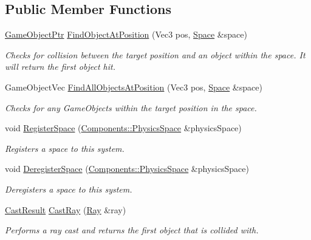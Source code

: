 \subsection*{Public Member Functions}
\begin{DoxyCompactItemize}
\item 
\hyperlink{classDCEngine_1_1GameObject}{Game\-Object\-Ptr} \hyperlink{classDCEngine_1_1Systems_1_1Physics_a786d02f2a6521108c37ac5918865f552}{Find\-Object\-At\-Position} (Vec3 pos, \hyperlink{classDCEngine_1_1Space}{Space} \&space)
\begin{DoxyCompactList}\small\item\em Checks for collision between the target position and an object within the space. It will return the first object hit. \end{DoxyCompactList}\item 
Game\-Object\-Vec \hyperlink{classDCEngine_1_1Systems_1_1Physics_accee13b6fdc523a6bcf346b3ce50e0bb}{Find\-All\-Objects\-At\-Position} (Vec3 pos, \hyperlink{classDCEngine_1_1Space}{Space} \&space)
\begin{DoxyCompactList}\small\item\em Checks for any Game\-Objects within the target position in the space. \end{DoxyCompactList}\item 
void \hyperlink{classDCEngine_1_1Systems_1_1Physics_a728b4c64d2f7e9a371c7618745fab814}{Register\-Space} (\hyperlink{classDCEngine_1_1Components_1_1PhysicsSpace}{Components\-::\-Physics\-Space} \&physics\-Space)
\begin{DoxyCompactList}\small\item\em Registers a space to this system. \end{DoxyCompactList}\item 
void \hyperlink{classDCEngine_1_1Systems_1_1Physics_ab0e5409ce0a9b929d435ca59944db2cc}{Deregister\-Space} (\hyperlink{classDCEngine_1_1Components_1_1PhysicsSpace}{Components\-::\-Physics\-Space} \&physics\-Space)
\begin{DoxyCompactList}\small\item\em Deregisters a space to this system. \end{DoxyCompactList}\item 
\hyperlink{structDCEngine_1_1CastResult}{Cast\-Result} \hyperlink{classDCEngine_1_1Systems_1_1Physics_a78eeead3cd3e5befab70292b27d06cb7}{Cast\-Ray} (\hyperlink{structDCEngine_1_1Ray}{Ray} \&ray)
\begin{DoxyCompactList}\small\item\em Performs a ray cast and returns the first object that is collided with. \end{DoxyCompactList}\item 

\end{DoxyCompactItemize}
